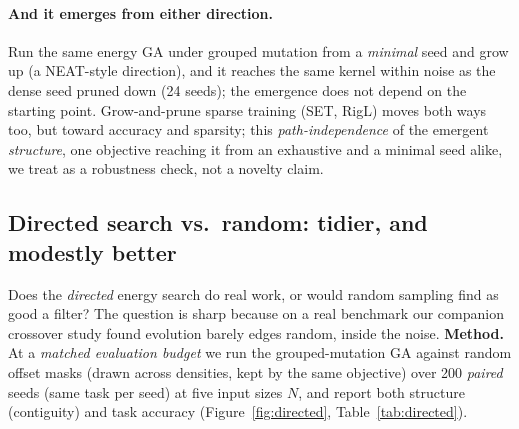\documentclass[11pt]{article}
\begin{document}
\paragraph{And it emerges from either direction.} Run the same energy GA under grouped mutation from a
\emph{minimal} seed and grow up (a NEAT-style direction), and it reaches the same kernel within noise as
the dense seed pruned down (24 seeds); the emergence does not depend on the starting point. Grow-and-prune
sparse training (SET, RigL) moves both ways too, but toward accuracy and sparsity; this
\emph{path-independence} of the emergent \emph{structure}, one objective reaching it from an exhaustive and
a minimal seed alike, we treat as a robustness check, not a novelty claim.

\subsection{Directed search vs.\ random: tidier, and modestly better}

Does the \emph{directed} energy search do real work, or would random sampling find as good a filter? The
question is sharp because on a real benchmark our companion crossover study found evolution barely edges
random, inside the noise. \textbf{Method.} At a \emph{matched evaluation budget} we run the
grouped-mutation GA against random offset masks (drawn across densities, kept by the same objective) over
200 \emph{paired} seeds (same task per seed) at five input sizes $N$, and report both structure
(contiguity) and task accuracy (Figure~\ref{fig:directed}, Table~\ref{tab:directed}).
\end{document}
